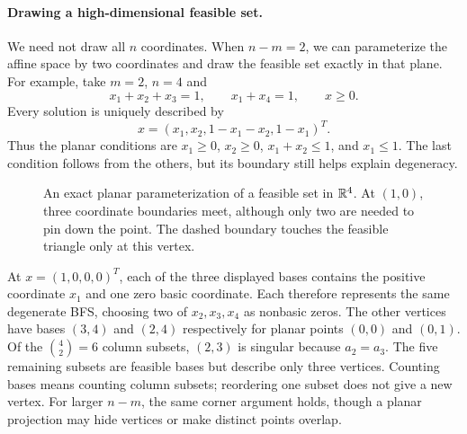 \documentclass[11pt,a4paper]{article}
\begin{document}
\paragraph{Drawing a high-dimensional feasible set.}
We need not draw all $n$ coordinates. When $n-m=2$, we can parameterize
the affine space by two coordinates and draw the feasible set exactly in
that plane. For example, take $m=2$, $n=4$ and
\[
  x_1+x_2+x_3=1,\qquad x_1+x_4=1,\qquad x\geq0.
\]
Every solution is uniquely described by
\[
  x=(x_1,x_2,1-x_1-x_2,1-x_1)^T.
\]
Thus the planar conditions are $x_1\geq0$, $x_2\geq0$,
$x_1+x_2\leq1$, and $x_1\leq1$. The last condition follows from the
others, but its boundary still helps explain degeneracy.
\begin{figure}[H]
  \centering
  \caption{An exact planar parameterization of a feasible set in $\mathbb{R}^4$.
    At $(1,0)$, three coordinate boundaries meet, although only two are
    needed to pin down the point. The dashed boundary touches the feasible
    triangle only at this vertex.}
  \label{fig:basis-vertex}
\end{figure}
At $x=(1,0,0,0)^T$, each of the three displayed bases contains the positive
coordinate $x_1$ and one zero basic coordinate. Each therefore represents
the same degenerate BFS, choosing two of $x_2,x_3,x_4$ as nonbasic zeros.
The other vertices have bases $(3,4)$ and $(2,4)$ respectively for planar
points $(0,0)$ and $(0,1)$. Of the $\binom42=6$ column subsets,
$(2,3)$ is singular because $a_2=a_3$. The five remaining subsets are
feasible bases but describe only three vertices. Counting bases means
counting column subsets; reordering one subset does not give a new vertex.
For larger $n-m$, the same corner argument holds, though a planar projection
may hide vertices or make distinct points overlap.
\end{document}
